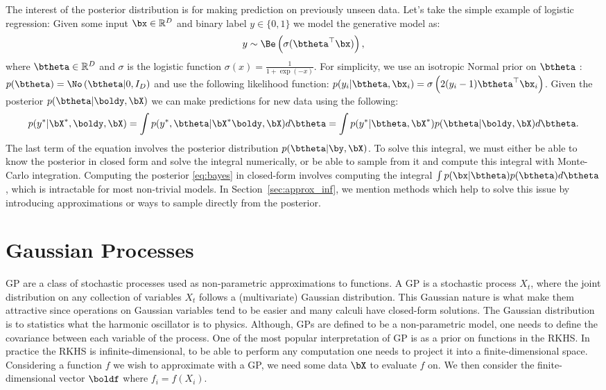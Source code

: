 The interest of the posterior distribution is for making prediction on previously unseen data.
Let's take the simple example of logistic regression:
Given some input $\bx \in \mathbb{R}^D$ and binary label $y\in \{ 0, 1\}$ we model the generative model as:
\begin{align}
y \sim \Be\left(\sigma(\btheta^\top \bx)\right),
\end{align}
where $\btheta\in\mathbb{R}^D$ and $\sigma$ is the logistic function $\sigma(x) = \frac{1}{1+\exp(-x)}$.
For simplicity, we use an isotropic Normal prior on $\btheta$ : $p(\btheta) = \No\left(\btheta|0, I_{D}\right)$ and use the following likelihood function: $p(y_i|\btheta,\bx_i) =\sigma\left(2(y_i - 1) \btheta^\top \bx_i\right)$.
Given the posterior $p(\btheta|\boldy, \bX)$ we can make predictions for new data using the following:
\begin{align}
p(y^*|\bX^*,\boldy,\bX) = \int p(y^*, \btheta|\bX^*\boldy, \bX)d\btheta = \int p(y^*|\btheta,\bX^*) p(\btheta|\boldy,\bX)d\btheta.
\end{align}
The last term of the equation involves the posterior distribution $p(\btheta|\by,\bX)$.
To solve this integral, we must either be able to know the posterior in closed form and solve the integral numerically, or be able to sample from it and compute this integral with Monte-Carlo integration.
Computing the posterior \eqref{eq:bayes} in closed-form involves computing the integral $\int p(\bx|\btheta)p(\btheta)d\btheta$, which is intractable for most non-trivial models.
In Section~\ref{sec:approx_inf}, we mention methods which help to solve this issue by introducing approximations or ways to sample directly from the posterior.

\section{Gaussian Processes}

\ac{GP} are a class of stochastic processes used as non-parametric approximations to functions.
A \ac{GP} is a stochastic process $X_t$, where the joint distribution on any collection of variables $X_t$ follows a (multivariate) Gaussian distribution.
This Gaussian nature is what make them attractive since operations on Gaussian variables tend to be easier and many calculi have closed-form solutions.
The Gaussian distribution is to statistics what the harmonic oscillator is to physics.
Although, \ac{GPs} are defined to be a non-parametric model, one needs to define the covariance between each variable of the process.
One of the most popular interpretation of \ac{GP} is as a prior on functions in the \acf{RKHS}.
In practice the \ac{RKHS} is infinite-dimensional, to be able to perform any computation one needs to project it into a finite-dimensional space.
Considering a function $f$ we wish to approximate with a \ac{GP}, we need some data $\bX$ to evaluate $f$ on.
We then consider the finite-dimensional vector $\boldf$ where $f_i = f(X_i)$.


